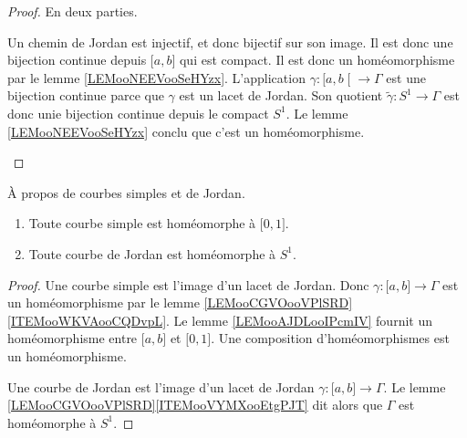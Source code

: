 \begin{proof}
    En deux parties.
    \begin{subproof}
        Un chemin de Jordan est injectif, et donc bijectif sur son image. Il est donc une bijection continue depuis \( \mathopen[ a , b \mathclose]\) qui est compact. Il est donc un homéomorphisme par le lemme \ref{LEMooNEEVooSeHYzx}.
        L'application \( \gamma\colon \mathopen[ a , b \mathclose[\to \Gamma \) est une bijection continue parce que \( \gamma\) est un lacet de Jordan. Son quotient \( \tilde \gamma\colon S^1\to \Gamma\) est donc unie bijection continue depuis le compact \( S^1\). Le lemme \ref{LEMooNEEVooSeHYzx} conclu que c'est un homéomorphisme.
    \end{subproof}
\end{proof}

\begin{corollary}
    À propos de courbes simples et de Jordan.
    \begin{enumerate}
        \item
            Toute courbe simple est homéomorphe à \( \mathopen[ 0 , 1 \mathclose]\).
        \item
            Toute courbe de Jordan est homéomorphe à \( S^1\).
    \end{enumerate}
\end{corollary}

\begin{proof}
    Une courbe simple est l'image d'un lacet de Jordan. Donc \( \gamma\colon \mathopen[ a , b \mathclose]\to \Gamma\) est un homéomorphisme par le lemme \ref{LEMooCGVOooVPlSRD}\ref{ITEMooWKVAooCQDvpL}. Le lemme \ref{LEMooAJDLooIPcmIV} fournit un homéomorphisme entre \( \mathopen[ a , b \mathclose]\) et \( \mathopen[ 0 , 1 \mathclose]\). Une composition d'homéomorphismes est un homéomorphisme.

    Une courbe de Jordan est l'image d'un lacet de Jordan \( \gamma\colon \mathopen[ a , b \mathclose]\to \Gamma\). Le lemme \ref{LEMooCGVOooVPlSRD}\ref{ITEMooVYMXooEtgPJT} dit alors que \( \Gamma\) est homéomorphe à \( S^1\).
\end{proof}


